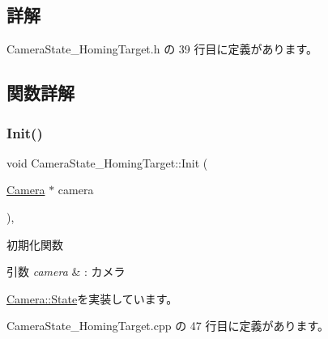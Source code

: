 \subsection{詳解}


 Camera\+State\+\_\+\+Homing\+Target.\+h の 39 行目に定義があります。



\subsection{関数詳解}
\mbox{\label{class_camera_state___homing_target_a9222190a5f26d564e99623b05941d382}} 
\subsubsection{\texorpdfstring{Init()}{Init()}}
{\footnotesize\ttfamily void Camera\+State\+\_\+\+Homing\+Target\+::\+Init (\begin{DoxyParamCaption}\item[{\mbox{\hyperlink{class_camera}{Camera}} $\ast$}]{camera }\end{DoxyParamCaption})\hspace{0.3cm}{\ttfamily [override]}, {\ttfamily [virtual]}}



初期化関数 


\begin{DoxyParams}{引数}
{\em camera} & \+: カメラ \\
\hline
\end{DoxyParams}


\mbox{\hyperlink{class_camera_1_1_state_aa1b81471ab15e64b3117ffe7de9560ff}{Camera\+::\+State}}を実装しています。



 Camera\+State\+\_\+\+Homing\+Target.\+cpp の 47 行目に定義があります。

